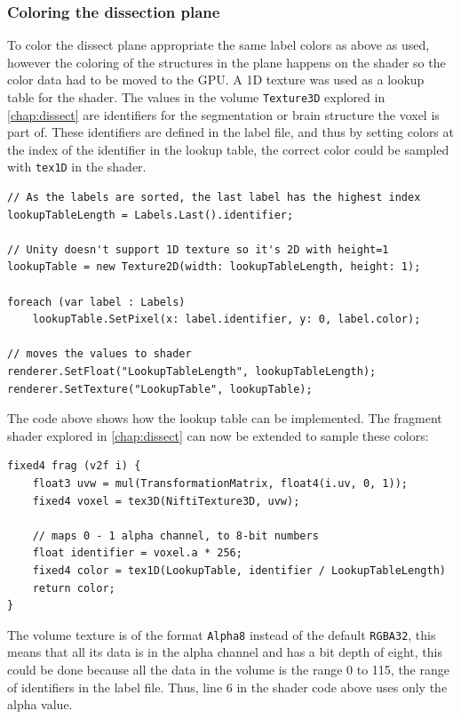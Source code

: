 \subsubsection*{Coloring the dissection plane}
To color the dissect plane appropriate the same label colors as above as used, however the coloring of the structures in the plane happens on the shader so the color data had to be moved to the GPU. A 1D texture was used as a lookup table for the shader. The values in the volume \texttt{Texture3D} explored in \autoref{chap:dissect} are identifiers for the segmentation or brain structure the voxel is part of. These identifiers are defined in the label file, and thus by setting colors at the index of the identifier in the lookup table, the correct color could be sampled with \texttt{tex1D} in the shader.

\begin{lstlisting}
// As the labels are sorted, the last label has the highest index
lookupTableLength = Labels.Last().identifier;

// Unity doesn't support 1D texture so it's 2D with height=1 
lookupTable = new Texture2D(width: lookupTableLength, height: 1);

foreach (var label : Labels)
    lookupTable.SetPixel(x: label.identifier, y: 0, label.color);

// moves the values to shader
renderer.SetFloat("LookupTableLength", lookupTableLength);
renderer.SetTexture("LookupTable", lookupTable);
\end{lstlisting}

The code above shows how the lookup table can be implemented. The fragment shader explored in \autoref{chap:dissect} can now be extended to sample these colors:
\begin{lstlisting}
fixed4 frag (v2f i) {
    float3 uvw = mul(TransformationMatrix, float4(i.uv, 0, 1));
    fixed4 voxel = tex3D(NiftiTexture3D, uvw);

    // maps 0 - 1 alpha channel, to 8-bit numbers
    float identifier = voxel.a * 256; 
    fixed4 color = tex1D(LookupTable, identifier / LookupTableLength)
    return color;
}
\end{lstlisting}

The volume texture is of the format \texttt{Alpha8} instead of the default \texttt{RGBA32}, this means that all its data is in the alpha channel and has a bit depth of eight, this could be done because all the data in the volume is the range 0 to 115, the range of identifiers in the label file. Thus, line 6 in the shader code above uses only the alpha value. 

